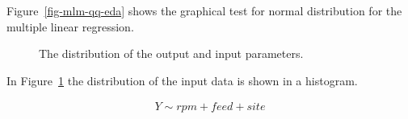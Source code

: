 \documentclass[
  a4paper,
]{scrbook}
\begin{document}
Figure~\ref{fig-mlm-qq-eda} shows the graphical test for normal
distribution for the multiple linear regression.

\begin{figure}[H]


\caption{\label{fig-mlm-hist}The distribution of the output and input
parameters.}

\end{figure}%

In Figure~\ref{fig-mlm-hist} the distribution of the input data is shown
in a histogram.

\begin{align}
Y \sim rpm + feed+ site \label{mlmmodel}
\end{align}

\begin{table}

\caption{\label{tbl-mlm-mdl}The output of the multiple linear regression
modelling}


\end{table}%
\end{document}
